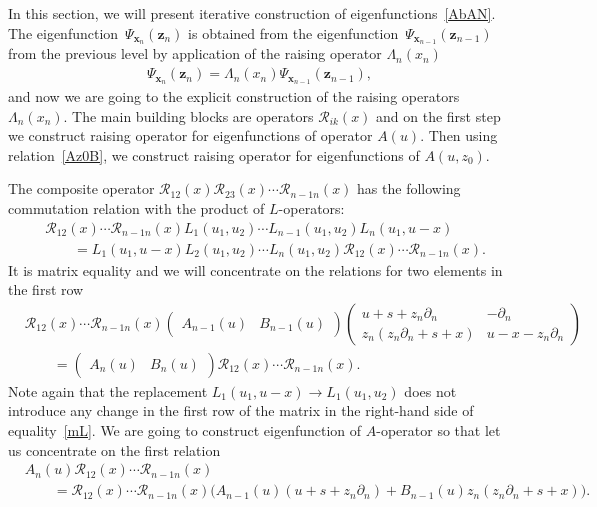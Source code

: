 \documentclass[pdftex]{sigma}
\numberwithin{equation}{section}
\begin{document}
In this section, we will present iterative construction of
eigenfunctions~\eqref{AbAN}. The eigenfunction~$\Psi_{\bm x_n}(\bm z_n)$
is obtained from the eigenfunction~$\Psi_{\bm x_{n-1}}(\bm z_{n-1})$
from the previous level by application of
the raising operator $\Lambda_n(x_n)$
\begin{align*}
\Psi_{\bm x_n}(\bm z_n) = \Lambda_n(x_n) \Psi_{\bm x_{n-1}}(\bm z_{n-1}) ,
\end{align*}
and now we are going to the explicit construction of
the raising operators $\Lambda_n(x_n)$.
The main building blocks are operators $\mathcal{R}_{ik}( x)$
and on the first step we construct raising operator
for eigenfunctions of operator $A(u)$. Then using relation~\eqref{Az0B},
we construct raising operator for eigenfunctions of $A(u,z_0)$.

The composite operator
$
\mathcal{R}_{12}( x)\mathcal{R}_{23}( x)\cdots
\mathcal{R}_{n-1 n}( x)
$
has the following commutation relation with the
product of $L$-operators:
\begin{align}
& \nonumber
\mathcal{R}_{12}( x)\cdots
\mathcal{R}_{n-1 n}( x)
L_{1}(u_{1},u_{2})\cdots
L_{n-1}(u_{1},u_{2})
L_{n}(u_{1},u-x) \\
& \qquad
= L_{1}(u_{1},u-x)
L_{2}(u_{1},u_{2})\cdots
L_{n}(u_{1},u_{2}) \mathcal{R}_{12}( x)\cdots
\mathcal{R}_{n-1 n}(x) .\label{mL}
\end{align}
It is matrix equality and we will concentrate on
the relations for two elements in the first row
\begin{align*}
&
\mathcal{R}_{12}( x)\cdots
\mathcal{R}_{n-1 n}( x)
\begin{pmatrix}
A_{n-1}(u) & B_{n-1}(u)
\end{pmatrix}
\begin{pmatrix} u+s+z_n \partial_n & -\partial_n\\
z_n(z_n\partial_n + s+x) & u-x-z_n\partial_n
\end{pmatrix} \\
&
\qquad= \begin{pmatrix}
A_{n}(u) & B_{n}(u)
\end{pmatrix}
\mathcal{R}_{12}( x)\cdots
\mathcal{R}_{n-1 n}( x) .
\end{align*}
Note again that the replacement $L_{1}(u_{1},u-x)\to L_{1}(u_{1},u_{2})$ does not introduce any change
in the first row of the matrix in the right-hand side of equality~\eqref{mL}.
We are going to construct eigenfunction of $A$-operator so that
let us concentrate on the first relation
\begin{align*}
&
A_{n}(u) \mathcal{R}_{12}( x)\cdots
\mathcal{R}_{n-1 n}( x) \\
&
\qquad=
\mathcal{R}_{12}( x)\cdots
\mathcal{R}_{n-1 n}( x)
\bigl(A_{n-1}(u) (u+s+z_n \partial_n)
+ B_{n-1}(u) z_n (z_n \partial_n +
s+x)\bigl) .
\end{align*}
\end{document}
